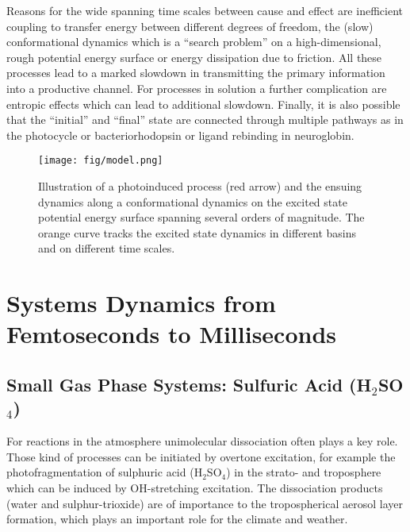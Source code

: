 \documentclass[journal=jacsat,manuscript=article]{achemso}
\begin{document}
Reasons for the wide spanning time scales between cause and effect are
inefficient coupling to transfer energy between different degrees of
freedom, the (slow) conformational dynamics which is a ``search
problem'' on a high-dimensional, rough potential energy surface or
energy dissipation due to friction. All these processes lead to a
marked slowdown in transmitting the primary information into a
productive channel. For processes in solution a further complication
are entropic effects which can lead to additional slowdown. Finally,
it is also possible that the ``initial'' and ``final'' state are
connected through multiple pathways as in the photocycle or
bacteriorhodopsin\cite{korenstein:1978,hendriks:1999} or ligand
rebinding in neuroglobin.\cite{MM.cei:2013}

\begin{figure}[t]
\centering
\texttt{[image: fig/model.png]}
\caption{Illustration of a photoinduced process (red arrow) and the
  ensuing dynamics along a conformational dynamics on the excited
  state potential energy surface spanning several orders of
  magnitude. The orange curve tracks the excited state dynamics in
  different basins and on different time scales.}
\label{fig:model}
\end{figure}




\section{Systems Dynamics from Femtoseconds to Milliseconds}


\subsection{Small Gas Phase Systems: Sulfuric Acid (H$_2$SO$_4$)}
For reactions in the atmosphere unimolecular dissociation often plays
a key role. Those kind of processes can be initiated by overtone
excitation, for example the photofragmentation of sulphuric acid
(H$_2$SO$_4$) in the strato- and troposphere which can be induced by
OH-stretching excitation. The dissociation products (water and
sulphur-trioxide) are of importance to the tropospherical aerosol
layer formation, which plays an important role for the climate and
weather\cite{vaida.sci.2003.vibphotodis}.\\
\end{document}
